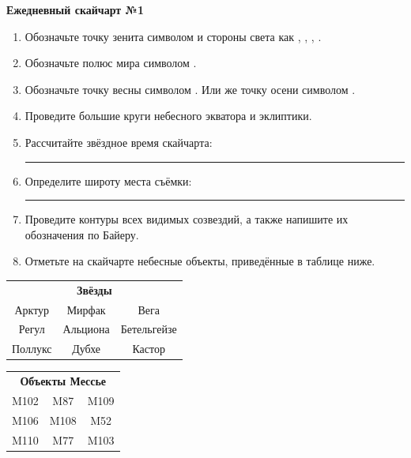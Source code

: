 \documentclass{./SAS-class-skygen}
\begin{document}
    
    
    
	\begin{center}
		\large\textbf{Ежедневный скайчарт №1}
	\end{center}

	\begin{enumerate}
		\item Обозначьте точку зенита символом  и стороны света как , , , .
		\item Обозначьте полюс мира символом .
		\item Обозначьте точку весны символом \Aries. Или же точку осени символом \Libra.
		\item Проведите большие круги небесного экватора и эклиптики.
		\item Рассчитайте звёздное время скайчарта: \rule{2cm}{0.4pt}
		\item Определите широту места съёмки: \rule{2cm}{0.4pt}
		\item Проведите контуры всех видимых созвездий, а также напишите их обозначения по Байеру.
		\item Отметьте на скайчарте небесные объекты, приведённые в таблице ниже.
	\end{enumerate}
	
    \vspace{0.5cm}

    \begin{table}[h!]
    \centering
    \begin{tabular}{ccc}
    \multicolumn{3}{c}{\textbf{Звёзды}} \\ Арктур & Мирфак & Вега \\
Регул & Альциона & Бетельгейзе \\
Поллукс & Дубхе & Кастор \\

\end{tabular}
    \hfill
    \begin{tabular}{ccc}
    \multicolumn{3}{c}{\textbf{Объекты Мессье}} \\ M102 & M87 & M109 \\
M106 & M108 & M52 \\
M110 & M77 & M103 \\

\end{tabular}
    \end{table}
	
\end{document}
